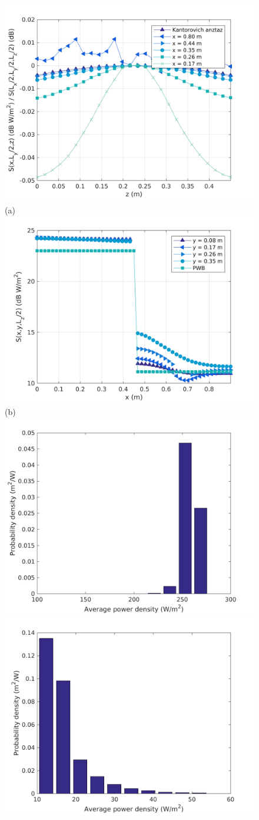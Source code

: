\documentclass[a4paper]{article}
\numberwithin{equation}{section}
\begin{document}
\begin{figure}[ht]
\begin{center}
\includegraphics[width=0.6\linewidth]{figures/DDM-EEBC_3D_DL_PowerDensityProfileZ}\\
{\footnotesize (a)}\\
\vspace{2mm}
\includegraphics[width=0.6\linewidth]{figures/DDM-EEBC_3D_DL_PowerDensityProfileX}\\
{\footnotesize (b)}\\
\vspace{2mm}
\includegraphics[width=0.45\linewidth]{figures/DDM-EEBC_3D_DL_PowerDensityPDF1}
\includegraphics[width=0.45\linewidth]{figures/DDM-EEBC_3D_DL_PowerDensityPDF2}

\end{center}
\end{figure}
\end{document}
